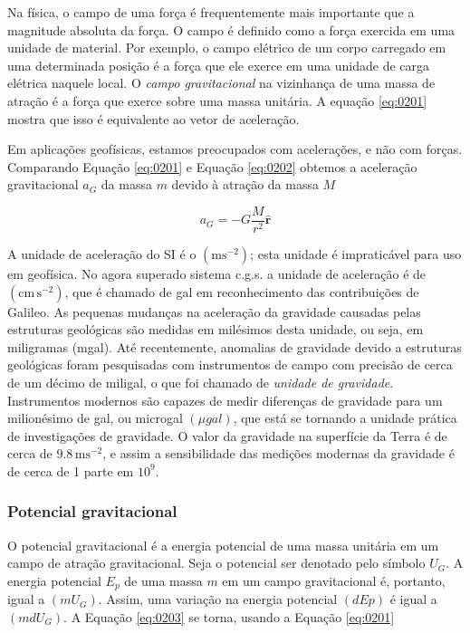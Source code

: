 \documentclass[]{book}
\theoremstyle{definition}
\theoremstyle{definition}
\theoremstyle{definition}
\theoremstyle{remark}
\begin{document}
Na física, o campo de uma força é frequentemente mais importante que a magnitude absoluta da força. O campo é definido como a força exercida em uma unidade de material. Por exemplo, o campo elétrico de um corpo carregado em uma determinada posição é a força que ele exerce em uma unidade de carga elétrica naquele local. O \emph{campo gravitacional} na vizinhança de uma massa de atração é a força que exerce sobre uma massa unitária. A equação \eqref{eq:0201} mostra que isso é equivalente ao vetor de aceleração.

Em aplicações geofísicas, estamos preocupados com acelerações, e não com forças. Comparando Equação \eqref{eq:0201} e Equação \eqref{eq:0202} obtemos a aceleração gravitacional \(a_G\) da massa \(m\) devido à atração da massa \(M\)

\begin{equation}
a_G = -G\frac{M}{r^2} \hat{\mathbf{r}} \label{eq:0205}
\end{equation}

A unidade de aceleração do SI é o \((\mathrm{m}\mathrm{s}^{-2})\); esta unidade é impraticável para uso em geofísica. No agora superado sistema c.g.s. a unidade de aceleração é de \((\mathrm{cm}\,\mathrm{s}^{-2})\), que é chamado de gal em reconhecimento das contribuições de Galileo. As pequenas mudanças na aceleração da gravidade causadas pelas estruturas geológicas são medidas em milésimos desta unidade, ou seja, em miligramas (mgal). Até recentemente, anomalias de gravidade devido a estruturas geológicas foram pesquisadas com instrumentos de campo com precisão de cerca de um décimo de miligal, o que foi chamado de \emph{unidade de gravidade}. Instrumentos modernos são capazes de medir diferenças de gravidade para um milionésimo de gal, ou microgal \((\mu gal)\), que está se tornando a unidade prática de investigações de gravidade. O valor da gravidade na superfície da Terra é de cerca de \(9.8\, \mathrm{m}\mathrm{s}^{-2}\), e assim a sensibilidade das medições modernas da gravidade é de cerca de 1 parte em \(10^9\).

\hypertarget{potencial-gravitacional}{%
\subsubsection{Potencial gravitacional}\label{potencial-gravitacional}}

O potencial gravitacional é a energia potencial de uma massa unitária em um campo de atração gravitacional. Seja o potencial ser denotado pelo símbolo \(U_G\). A energia potencial \(E_p\) de uma massa \(m\) em um campo gravitacional é, portanto, igual a \((mU_G)\). Assim, uma variação na energia potencial \((dEp)\) é igual a \((m dU_G)\). A Equação \eqref{eq:0203} se torna, usando a Equação \eqref{eq:0201}
\end{document}
